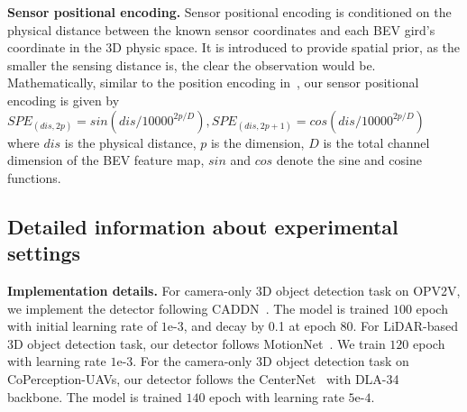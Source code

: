 \textbf{Sensor positional encoding.} Sensor positional encoding is conditioned on the physical distance between the known sensor coordinates and each BEV gird's coordinate in the 3D physic space. It is introduced to provide spatial prior, as the smaller the sensing distance is, the clear the observation would be. Mathematically, similar to the position encoding in~\cite{vaswani2017attention}, our sensor positional encoding is given by 
$
SPE_{(dis, 2p)} = sin(dis/10000^{2p/D}),
SPE_{(dis, 2p+1)} = cos(dis/10000^{2p/D})
$
where $dis$ is the physical distance, $p$ is the dimension, $D$ is the total channel dimension of the BEV feature map, $sin$ and $cos$ denote the sine and cosine functions.

\subsection{Detailed information about experimental settings}
\textbf{Implementation details.} For camera-only 3D object detection task on OPV2V, we implement the detector following CADDN~\cite{CaDDN}. The model is trained $100$ epoch with initial learning rate of $1$e-$3$, and decay by 0.1 at epoch 80. For LiDAR-based 3D object detection task, our detector follows MotionNet~\cite{Wu2020MotionNetJP}. We train $120$ epoch with learning rate $1$e-$3$. For the camera-only 3D object detection task on CoPerception-UAVs, our detector follows the CenterNet~\cite{zhou2019objects} with DLA-34~\cite{yu2018dla} backbone. The model is trained $140$ epoch with learning rate $5$e-$4$. 



